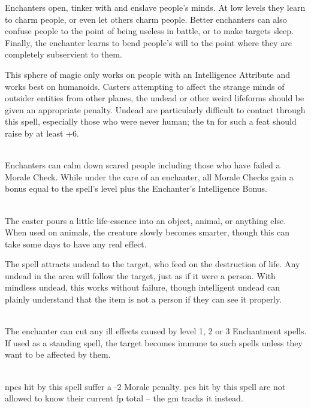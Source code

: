 \begin{multicols}{2}

\noindent
Enchanters open, tinker with and enslave people's minds. At low levels they learn to charm people, or even let others charm people. Better enchanters can also confuse people to the point of being useless in battle, or to make targets sleep. Finally, the enchanter learns to bend people's will to the point where they are completely subservient to them.

This sphere of magic only works on people with an Intelligence Attribute and works best on humanoids. Casters attempting to affect the strange minds of outsider entities from other planes, the undead or other weird lifeforms should be given an appropriate penalty. Undead are particularly difficult to contact through this spell, especially those who were never human; the \gls{tn} for such a feat should raise by at least +6.

\spelllevel

\\
Enchanters can calm down scared people including those who have failed a Morale Check.
While under the care of an enchanter, all Morale Checks gain a bonus equal to the spell's level plus the Enchanter's Intelligence Bonus.

\\
The caster pours a little life-essence into an object, animal, or anything else.
When used on animals, the creature slowly becomes smarter, though this can take some days to have any real effect.

The spell attracts undead to the target, who feed on the destruction of life.  Any undead in the area will follow the target, just as if it were a person.
With mindless undead, this works without failure, though intelligent undead can plainly understand that the item is not a person if they can see it properly.

\\
The enchanter can cut any ill effects caused by level 1, 2 or 3 Enchantment spells. If used as a standing spell, the target becomes immune to such spells unless they want to be affected by them.

\\
\Glspl{npc} hit by this spell suffer a -2 Morale penalty.  \Glspl{pc} hit by this spell are not allowed to know their current \gls{fp} total -- the \gls{gm} tracks it instead.


\end{multicols}
